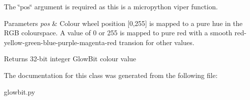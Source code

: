 The \char`\"{}pos\char`\"{} argument is required as this is a micropython viper function.


\begin{DoxyParams}{Parameters}
{\em pos} & Colour wheel position \mbox{[}0,255\mbox{]} is mapped to a pure hue in the R\+GB colourspace. A value of 0 or 255 is mapped to pure red with a smooth red-\/yellow-\/green-\/blue-\/purple-\/magenta-\/red transion for other values. \\
\hline
\end{DoxyParams}
\begin{DoxyReturn}{Returns}
32-\/bit integer Glow\+Bit colour value 
\end{DoxyReturn}


The documentation for this class was generated from the following file\+:\begin{DoxyCompactItemize}
\item 
glowbit.\+py\end{DoxyCompactItemize}
